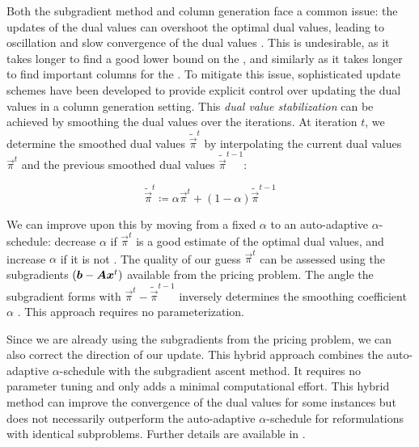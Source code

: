 Both the subgradient method and column generation face a common issue: the updates of the dual values can overshoot the optimal dual values, leading to oscillation and slow convergence of the dual values \cite{thebook, pessoa2013out, bastubbe2018computational}. This is undesirable, as it takes longer to find a good lower bound on the \IP{}, and similarly as it takes longer to find important columns for the \MP{}. To mitigate this issue, sophisticated update schemes have been developed to provide explicit control over updating the dual values in a column generation setting. This \textit{dual value stabilization} can be achieved by smoothing the dual values over the iterations. At iteration $t$, we determine the smoothed dual values $\widetilde{\vec{\pi}}^t$ by interpolating the current dual values $\vec{\pi}^{t}$ and the previous smoothed dual values $\widetilde{\vec{\pi}}^{t-1}$:

\begin{equation*}
\widetilde{\vec{\pi}}^t \coloneqq \alpha \vec{\pi}^{t} + (1 - \alpha) \widetilde{\vec{\pi}}^{t-1}
\end{equation*}

We can improve upon this by moving from a fixed $\alpha$ to an auto-adaptive $\alpha$-schedule: decrease $\alpha$ if $\vec{\pi}^{t}$ is a good estimate of the optimal dual values, and increase $\alpha$ if it is not \cite{pessoa2013out,pessoa2018automation}. The quality of our guess $\vec{\pi}^{t}$ can be assessed using the subgradients $\left( {\bm{b}} - {\bm{A}} {\bm{x}}^t \right)$ available from the pricing problem. The angle the subgradient forms with $\vec{\pi}^{t} - \widetilde{\vec{\pi}}^{t-1}$ inversely determines the smoothing coefficient $\alpha$ \cite{pessoa2013out,pessoa2018automation}. This approach requires no parameterization.

Since we are already using the subgradients from the pricing problem, we can also correct the direction of our update. This hybrid approach combines the auto-adaptive $\alpha$-schedule with the subgradient ascent method. It requires no parameter tuning and only adds a minimal computational effort. This hybrid method can improve the convergence of the dual values for some instances but does not necessarily outperform the auto-adaptive $\alpha$-schedule for reformulations with identical subproblems. Further details are available in \cite{pessoa2013out, pessoa2018automation}.
